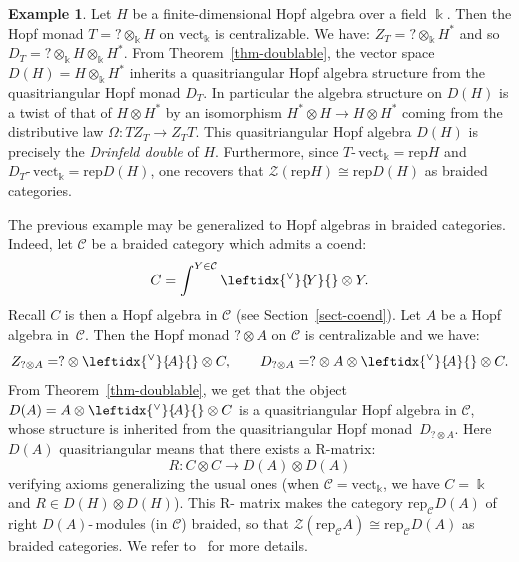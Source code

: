 \documentclass[a4paper]{amsart}
\theoremstyle{definition}
\newtheorem{exa}[thm]{Example}
\newcommand{\co}{\colon}
\newcommand{\cc}{\mathcal{C}}
\newcommand{\zz}{\mathcal{Z}}
\newcommand{\kk}{\Bbbk}
\newcommand{\Rt}{$\mathrm{R}$\nobreakdash-\hspace{0pt}}
\newcommand{\ti}{\mbox{-}\,}
\newcommand{\vect}{\mathrm{vect}}
\newcommand{\rep}{\mathrm{rep}}
\newcommand{\ldual}[1]{\leftidx{^\vee}{\!#1}{}}
\begin{document}
\begin{exa}\label{rem-doublable}
Let $H$ be a finite-dimensional Hopf algebra over a field $\kk$. Then the Hopf monad $T=?\otimes_\kk H$ on $\vect_\kk$ is
centralizable. We have: $Z_T=? \otimes_\kk H^*$ and so $D_T=?\otimes_\kk H \otimes_\kk H^*$. From
Theorem~\ref{thm-doublable}, the vector space $D(H)=H\otimes_\kk H^*$ inherits a quasitriangular Hopf algebra structure from
the quasitriangular Hopf monad $D_T$. In particular the algebra structure on $D(H)$ is a twist of that of $H \otimes H^*$ by
an isomorphism $H^* \otimes H \to H \otimes H^*$ coming from the distributive law $\Omega\co T Z_T \to Z_TT$. This
quasitriangular Hopf algebra $D(H)$ is precisely the \emph{Drinfeld double} of $H$. Furthermore, since
$T\ti\vect_\kk=\rep{H}$ and $D_T\ti\vect_\kk=\rep{D(H)}$, one recovers that $\zz(\rep{H}) \cong \rep{D(H)}$ as braided
categories.
\end{exa}

The previous example may be generalized to Hopf algebras in braided categories. Indeed, let $\cc$ be a braided category
which admits a coend:
\begin{equation*}
C=\int^{Y \in \cc} \ldual{Y} \otimes Y.
\end{equation*}
Recall $C$ is then a Hopf algebra in $\cc$ (see Section~\ref{sect-coend}). Let $A$ be a Hopf algebra in~$\cc$. Then the Hopf
monad $? \otimes A$ on $\cc$ is centralizable and we have:
\begin{equation*}
Z_{? \otimes A}=? \otimes \ldual{A} \otimes C, \qquad D_{? \otimes A}=? \otimes A \otimes \ldual{A} \otimes C.
\end{equation*}
From Theorem~\ref{thm-doublable}, we get that the object $D(A)=A \otimes \ldual{A} \otimes C$ is a quasitriangular Hopf
algebra in $\cc$, whose structure is inherited from the quasitriangular Hopf monad~$D_{? \otimes A}$. Here $D(A)$
quasitriangular means that there exists a \Rt matrix:
\begin{equation*}
R \co C \otimes C \to D(A) \otimes D(A)
\end{equation*}
verifying axioms generalizing the usual ones (when $\cc=\vect_\kk$, we have $C=\kk$ and $R\in D(H) \otimes D(H)$). This \Rt
matrix makes the category $\rep_\cc{D(A)}$ of right $D(A)$\ti modules (in $\cc$) braided, so that $\zz(\rep_\cc{A}) \cong
\rep_\cc{D(A)}$ as braided categories. We refer to~\cite{BV3} for more details.\\
\end{document}
